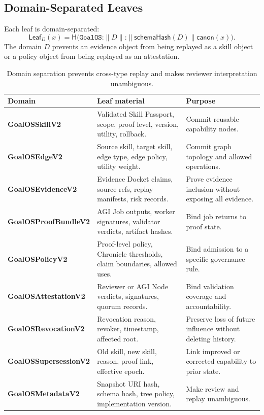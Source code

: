 \documentclass[11pt,letterpaper]{article}
\newcommand{\domain}[1]{\texttt{#1}}
\newcommand{\hash}{\mathsf{H}}
\newcommand{\canon}{\mathsf{canon}}
\newcommand{\Leaf}{\mathsf{Leaf}}
\begin{document}
\subsection{Domain-Separated Leaves}
Each leaf is domain-separated:
\begin{equation}
\Leaf_D(x) = \hash\big(\domain{GoalOS:} \parallel D \parallel \domain{:} \parallel \mathsf{schemaHash}(D) \parallel \canon(x)\big).\label{eq:leaf}
\end{equation}
The domain $D$ prevents an evidence object from being replayed as a skill object or a policy object from being replayed as an attestation.

\begin{table}[H]
\small
\centering
\begin{tabularx}{\textwidth}{>{\ttfamily\bfseries}p{1.45in}Y Y}
\toprule
\textnormal{Domain} & Leaf material & Purpose \\
\midrule
GoalOSSkillV2 & Validated Skill Passport, scope, proof level, version, utility, rollback. & Commit reusable capability nodes. \\
GoalOSEdgeV2 & Source skill, target skill, edge type, edge policy, utility weight. & Commit graph topology and allowed operations. \\
GoalOSEvidenceV2 & Evidence Docket claims, source refs, replay manifests, risk records. & Prove evidence inclusion without exposing all evidence. \\
GoalOSProofBundleV2 & AGI Job outputs, worker signatures, validator verdicts, artifact hashes. & Bind job returns to proof state. \\
GoalOSPolicyV2 & Proof-level policy, Chronicle thresholds, claim boundaries, allowed uses. & Bind admission to a specific governance rule. \\
GoalOSAttestationV2 & Reviewer or AGI Node verdicts, signatures, quorum records. & Bind validation coverage and accountability. \\
GoalOSRevocationV2 & Revocation reason, revoker, timestamp, affected root. & Preserve loss of future influence without deleting history. \\
GoalOSSupersessionV2 & Old skill, new skill, reason, proof link, effective epoch. & Link improved or corrected capability to prior state. \\
GoalOSMetadataV2 & Snapshot URI hash, schema hash, tree policy, implementation version. & Make review and replay unambiguous. \\
\bottomrule
\end{tabularx}
\caption{Domain separation prevents cross-type replay and makes reviewer interpretation unambiguous.}
\end{table}
\end{document}
